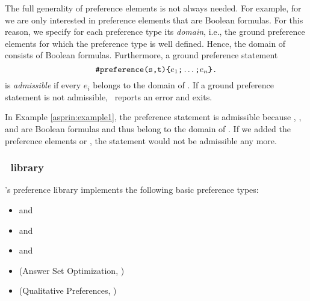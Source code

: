 The full generality of preference elements is not always needed.
For example, for  we are only interested in preference elements that are Boolean formulas.
For this reason, we specify for each preference type its \emph{domain}, 
i.e., the ground preference elements for which the preference type is well defined.
Hence, the domain of  consists of Boolean formulas.
Furthermore, a ground preference statement
\[\texttt{\#preference(s,t)\{}e_1\texttt{;}\dots\texttt{;}e_n\texttt{\}.}\]
is \emph{admissible} if every ${e}_i$ belongs to the domain of .
If a ground preference statement is not admissible, \asprin\ reports an error and exits. 
\begin{example}
In Example \ref{asprin:example1}, the preference statement   
is admissible because , , and  are Boolean formulas
and thus belong to the domain of . 
If we added the preference elements  or , 
the statement would not be admissible any more.
\end{example}

\subsubsection{\asprin\ library}

\asprin's preference library implements the following basic preference types:
\begin{itemize}
	\item  {} and    
	\item  {} and    
	\item  {} and    
	\item  {}   (Answer Set Optimization, \cite{brnitr03a})   
	\item  {} (Qualitative Preferences, \cite{rogima10a})  
\end{itemize}

